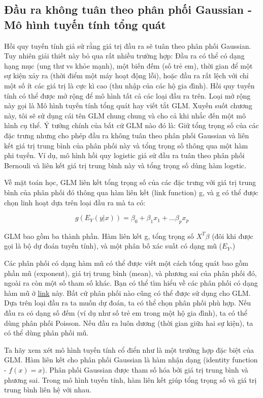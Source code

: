 \subsection{Đầu ra không tuân theo phân phối Gaussian - Mô hình tuyến tính tổng quát}
\label{GLMs}
Hồi quy tuyến tính giả sử rằng giá trị đầu ra sẽ tuân theo phân phối Gaussian. Tuy nhiên giải thiết này bỏ qua rất nhiều trường hợp: Đầu ra có thể có dạng hạng mục (ung thư vs khỏe mạnh), một biến đếm (số trẻ em), thời gian để một sự kiện xảy ra (thời điểm một máy hoạt động lỗi), hoặc đầu ra rất lệch với chỉ một số ít các giá trị là cực kì cao (thu nhập của các hộ gia đình). Hồi quy tuyến tính có thể được mở rộng để mô hình tất cả các loại đầu ra trên. Loại mở rộng này gọi là Mô hình tuyến tính tổng quát hay  viết tắt GLM. Xuyến suốt chương này, tôi sẽ sử dụng cái tên GLM chung chung và cho cả khi nhắc đến một mô hình cụ thể. Ý tưởng chính của bất cứ GLM nào đó là: Giữ tổng trọng số của các đặc trưng nhưng cho phép đầu ra không tuân theo phân phối Gaussian và liên kết giá trị trung bình của phân phối này và tổng trọng số thông qua một hàm phi tuyến. Ví dụ, mô hình hồi quy logistic giả sử đầu ra tuân theo phân phối Bernouli và liên kết giá trị trung bình này và tổng trọng số dùng hàm logstic.

Về mặt toán học, GLM liên kết tổng trọng số của các đặc trưng với giá trị trung bình của phân phối đó thông qua hàm liên kết (link function) g, và g có thể được chọn linh hoạt dựa trên loại đầu ra mà ta có:

$$g(E_Y(y|x))=\beta_0+\beta_1{}x_{1}+\ldots{}\beta_p{}x_{p}$$

GLM bao gồm ba thành phần. Hàm liên kết g, tổng trọng số $X^T\beta$ (đôi khi được gọi là bộ dự đoán tuyến tính), và một phân bố xác suất có dạng mũ ($E_Y$.)

Các phân phối có dạng hàm mũ có thể được viết một cách tổng quát bao gồm phần mũ (exponent), giá trị trung bình (mean), và phương sai của phân phối đó, ngoài ra còn một số tham số khác. Bạn có thể tìm hiểu về các phân phối có dạng hàm mũ ở \href{https://en.wikipedia.org/wiki/Exponential_family#Table_of_distributions}{link} này. Bất cứ phân phối nào cũng có thể được sử dụng cho GLM. Dựa trên loại đầu ra ta muốn dự đoán, ta có thể chọn phân phối phù hợp. Nếu đầu ra có dạng số đếm (ví dụ như số trẻ em trong một hộ gia đình), ta có thể dùng phân phối Poisson. Nếu đầu ra luôn dương (thời gian giữa hai sự kiện), ta có thể dùng phân phối mũ.

Ta hãy xem xét mô hình tuyến tính cổ điển như là một trường hợp đặc biệt của GLM. Hàm liên kết cho phân phối Gaussian là hàm nhận dạng (identity function - $f(x)=x$). Phân phối Gaussian được tham số hóa bởi giá trị trung bình và phương sai. Trong mô hình tuyến tính, hàm liên kết giúp tổng trọng số và giá trị trung bình liên hệ với nhau.

